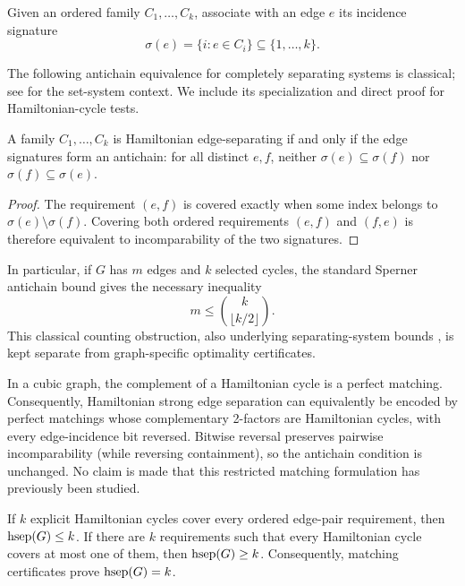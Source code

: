Given an ordered family \(C_1,\ldots,C_k\), associate with an edge \(e\) its
incidence signature
\[
 \sigma(e)=\{i:e\in C_i\}\subseteq\{1,\ldots,k\}.
\]

The following antichain equivalence for completely separating systems is
classical; see \citet{Dickson1969,Spencer1970} for the set-system context.  We
include its specialization and direct proof for Hamiltonian-cycle tests.

\begin{proposition}
\label{prop:signature-antichain}
A family \(C_1,\ldots,C_k\) is Hamiltonian edge-separating if and only if the
edge signatures form an antichain: for all distinct \(e,f\), neither
\(\sigma(e)\subseteq\sigma(f)\) nor \(\sigma(f)\subseteq\sigma(e)\).
\end{proposition}

\begin{proof}
The requirement \((e,f)\) is covered exactly when some index belongs to
\(\sigma(e)\setminus\sigma(f)\).  Covering both ordered requirements
\((e,f)\) and \((f,e)\) is therefore equivalent to incomparability of the two
signatures.
\end{proof}

In particular, if \(G\) has \(m\) edges and \(k\) selected cycles, the standard
Sperner antichain bound gives the necessary inequality
\[
 m\le \binom{k}{\lfloor k/2\rfloor}.
\]
This classical counting obstruction, also underlying separating-system bounds
\citep{Katona1966,Dickson1969,Spencer1970}, is kept separate from
graph-specific optimality certificates.

\begin{observation}
\label{obs:matching-formulation}
In a cubic graph, the complement of a Hamiltonian cycle is a perfect matching.
Consequently, Hamiltonian strong edge separation can equivalently be encoded
by perfect matchings whose complementary 2-factors are Hamiltonian cycles,
with every edge-incidence bit reversed.  Bitwise reversal preserves pairwise
incomparability (while reversing containment), so the antichain condition is
unchanged.  No claim is made that this restricted matching formulation has
previously been studied.
\end{observation}

\begin{lemma}
\label{lem:certificate-principle}
If \(k\) explicit Hamiltonian cycles cover every ordered edge-pair requirement,
then \(\operatorname{hsep}(G)\le k\).  If there are \(k\) requirements such that every
Hamiltonian cycle covers at most one of them, then \(\operatorname{hsep}(G)\ge k\).
Consequently, matching certificates prove \(\operatorname{hsep}(G)=k\).
\end{lemma}

